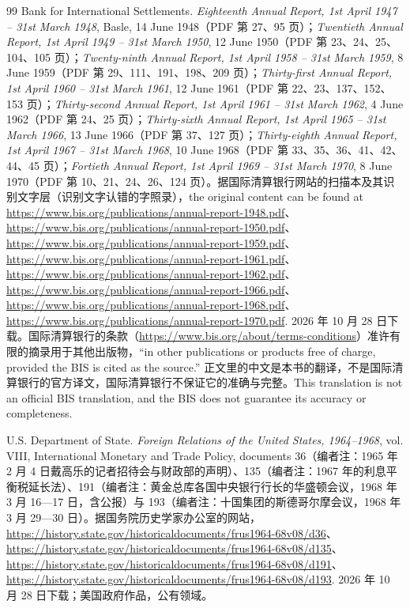 \begin{thebibliography}{99}
 Bank for International Settlements. \emph{Eighteenth Annual Report, 1st April 1947 -- 31st March 1948}, Basle, 14 June 1948（PDF 第 27、95 页）；\emph{Twentieth Annual Report, 1st April 1949 -- 31st March 1950}, 12 June 1950（PDF 第 23、24、25、104、105 页）；\emph{Twenty-ninth Annual Report, 1st April 1958 -- 31st March 1959}, 8 June 1959（PDF 第 29、111、191、198、209 页）；\emph{Thirty-first Annual Report, 1st April 1960 -- 31st March 1961}, 12 June 1961（PDF 第 22、23、137、152、153 页）；\emph{Thirty-second Annual Report, 1st April 1961 -- 31st March 1962}, 4 June 1962（PDF 第 24、25 页）；\emph{Thirty-sixth Annual Report, 1st April 1965 -- 31st March 1966}, 13 June 1966（PDF 第 37、127 页）；\emph{Thirty-eighth Annual Report, 1st April 1967 -- 31st March 1968}, 10 June 1968（PDF 第 33、35、36、41、42、44、45 页）；\emph{Fortieth Annual Report, 1st April 1969 -- 31st March 1970}, 8 June 1970（PDF 第 10、21、24、26、124 页）。据国际清算银行网站的扫描本及其识别文字层（识别文字认错的字照录），the original content can be found at \url{https://www.bis.org/publications/annual-report-1948.pdf}、\url{https://www.bis.org/publications/annual-report-1950.pdf}、\url{https://www.bis.org/publications/annual-report-1959.pdf}、\url{https://www.bis.org/publications/annual-report-1961.pdf}、\url{https://www.bis.org/publications/annual-report-1962.pdf}、\url{https://www.bis.org/publications/annual-report-1966.pdf}、\url{https://www.bis.org/publications/annual-report-1968.pdf}、\url{https://www.bis.org/publications/annual-report-1970.pdf}. 2026 年 10 月 28 日下载。国际清算银行的条款（\url{https://www.bis.org/about/terms-conditions}）准许有限的摘录用于其他出版物，“in other publications or products free of charge, provided the BIS is cited as the source.” 正文里的中文是本书的翻译，不是国际清算银行的官方译文，国际清算银行不保证它的准确与完整。This translation is not an official BIS translation, and the BIS does not guarantee its accuracy or completeness.

 U.S. Department of State. \emph{Foreign Relations of the United States, 1964--1968}, vol. VIII, International Monetary and Trade Policy, documents 36（编者注：1965 年 2 月 4 日戴高乐的记者招待会与财政部的声明）、135（编者注：1967 年的利息平衡税延长法）、191（编者注：黄金总库各国中央银行行长的华盛顿会议，1968 年 3 月 16—17 日，含公报）与 193（编者注：十国集团的斯德哥尔摩会议，1968 年 3 月 29—30 日）。据国务院历史学家办公室的网站，\url{https://history.state.gov/historicaldocuments/frus1964-68v08/d36}、\url{https://history.state.gov/historicaldocuments/frus1964-68v08/d135}、\url{https://history.state.gov/historicaldocuments/frus1964-68v08/d191}、\url{https://history.state.gov/historicaldocuments/frus1964-68v08/d193}. 2026 年 10 月 28 日下载；美国政府作品，公有领域。


\end{thebibliography}
